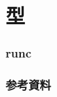 \documentclass[unicode, 14pt, aspectratio=169]{beamer}
\begin{document}
\section{型}
  
\begin{frame}[t]
  \frametitle{runc}
\end{frame}
\begin{frame}[allowframebreaks,t]
  \frametitle{参考資料}  
  \printbibliography
\end{frame}
\end{document}
